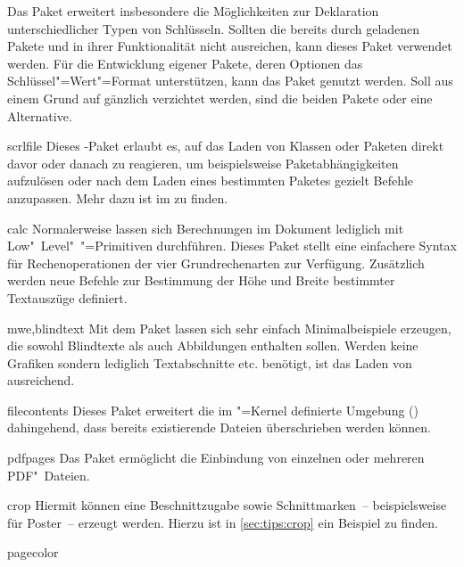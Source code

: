 \begin{packages}
  Das Paket  erweitert insbesondere die Möglichkeiten zur 
  Deklaration unterschiedlicher Typen von Schlüsseln. Sollten die bereits durch 
  \TUDScript geladenen Pakete  und  in ihrer 
  Funktionalität nicht ausreichen, kann dieses Paket verwendet werden. Für die 
  Entwicklung eigener Pakete, deren Optionen das Schlüssel"=Wert"=Format 
  unterstützen, kann das Paket  genutzt werden. Soll aus einem 
  Grund auf \KOMAScript{} gänzlich verzichtet werden, sind die beiden Pakete 
   oder  eine Alternative.
\item[scrlfile]
  Dieses \KOMAScript-Paket erlaubt es, auf das Laden von Klassen oder Paketen 
  direkt davor oder danach zu reagieren, um beispielsweise Paketabhängigkeiten 
  aufzulösen oder nach dem Laden eines bestimmten Paketes gezielt Befehle 
  anzupassen. Mehr dazu ist im \scrguide zu finden.
\item[calc]
  Normalerweise lassen sich Berechnungen im Dokument lediglich mit 
  Low"~Level"~"=Primitiven durchführen. Dieses Paket stellt eine 
  einfachere Syntax für Rechenoperationen der vier Grundrechenarten zur 
  Verfügung. Zusätzlich werden neue Befehle zur Bestimmung der Höhe und Breite 
  bestimmter Textauszüge definiert.
\item[mwe,blindtext]
  Mit dem Paket  lassen sich sehr einfach Minimalbeispiele 
  erzeugen, die sowohl Blindtexte als auch Abbildungen enthalten sollen. Werden 
  keine Grafiken sondern lediglich Textabschnitte etc. benötigt, ist das Laden 
  von  ausreichend.
\item[filecontents]
  Dieses Paket erweitert die im "=Kernel definierte Umgebung 
  () dahingehend, dass bereits 
  existierende Dateien überschrieben werden können.
\item[pdfpages]
  Das Paket ermöglicht die Einbindung von einzelnen oder mehreren PDF"~Dateien.
\item[crop]
  Hiermit können eine Beschnittzugabe sowie Schnittmarken~-- beispielsweise für 
  Poster~-- erzeugt werden. Hierzu ist in \autoref{sec:tips:crop} ein Beispiel 
  zu finden.
\item[pagecolor]

\end{packages}
